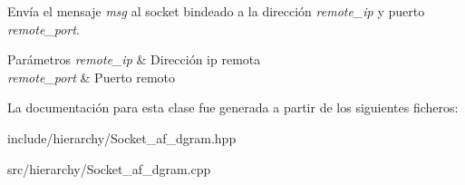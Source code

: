 Envía el mensaje {\itshape msg} al socket bindeado a la dirección {\itshape remote\+\_\+ip} y puerto {\itshape remote\+\_\+port}. 


\begin{DoxyParams}{Parámetros}
{\em remote\+\_\+ip} & Dirección ip remota \\
\hline
{\em remote\+\_\+port} & Puerto remoto \\
\hline
\end{DoxyParams}


La documentación para esta clase fue generada a partir de los siguientes ficheros\+:\begin{DoxyCompactItemize}
\item 
include/hierarchy/Socket\+\_\+af\+\_\+dgram.\+hpp\item 
src/hierarchy/Socket\+\_\+af\+\_\+dgram.\+cpp\end{DoxyCompactItemize}
